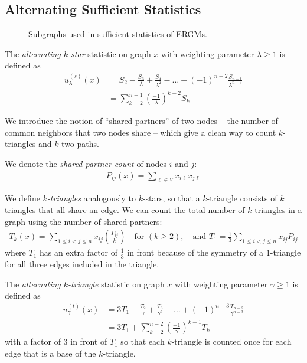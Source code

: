 \subsection{Alternating Sufficient Statistics}

\begin{figure}[!ht]
	\label{fig:graphdiagram}
	\centering
	
	\caption{Subgraphs used in sufficient statistics of ERGMs.}
\end{figure}


\begin{definition}
	 \label{def:altkstar}
	The \emph{alternating $k$-star} statistic on graph $x$ with weighting parameter $\lambda \geq 1$ is defined as
	\begin{align*}
	u^{(s)}_\lambda(x) & = S_2 - \frac{S_3}{\lambda} + \frac{S_4}{\lambda^2} - \dots + (-1)^{n-2} \frac{S_{n-1}}{\lambda^{n-3}} \\
	&  = \sum_{k = 2}^{n-1} \left(\frac{-1}{\lambda}\right)^{k-2} S_k
	\end{align*}
\end{definition}

We introduce the notion of ``shared partners'' of two nodes -- the number of common neighbors that two nodes share -- which give a clean way to count $k$-triangles and $k$-two-paths.
\begin{definition}
	\label{def:shared_partners}
	We denote the \emph{shared partner count} of nodes $i$ and $j$: 
	\begin{align}
	P_{ij}(x) = \sum_{\ell \in V} x_{i \ell} x_{j \ell}
	\end{align} 
\end{definition}

We define \emph{$k$-triangles} analogously to $k$-stars, so that a $k$-triangle consists of $k$ triangles that all share an edge. We can count the total number of $k$-triangles in a graph using the number of shared partners:
\begin{align}
\label{eq:k-triangle}
T_k(x) = \sum_{1 \leq i < j \leq n} x_{ij} \binom{P_{ij}}{k} \quad \text{for } (k \geq 2), \quad \text{and } T_1 = \frac{1}{3} \sum_{1 \leq i < j \leq n} x_{ij} P_{ij}
\end{align}
where $T_1$ has an extra factor of $\frac{1}{3}$ in front because of the symmetry of a $1$-triangle for all three edges included in the triangle.

\begin{definition}
	\label{def:altktri}
	The \emph{alternating $k$-triangle} statistic on graph $x$ with weighting parameter $\gamma \geq 1$ is defined as
	\begin{align*}
	u^{(t)}_\gamma(x) & = 3T_1 - \frac{T_2}{\gamma} + \frac{T_3}{\gamma^2} - \dots + (-1)^{n-3} \frac{T_{n-2}}{\gamma^{n-3}} \\
	&  = 3 T_1 + \sum_{k = 2}^{n-2} \left(\frac{-1}{\gamma}\right)^{k-1} T_k
	\end{align*}
	with a factor of $3$ in front of $T_1$ so that each $k$-triangle is counted once for each edge that is a base of the $k$-triangle.
\end{definition}


